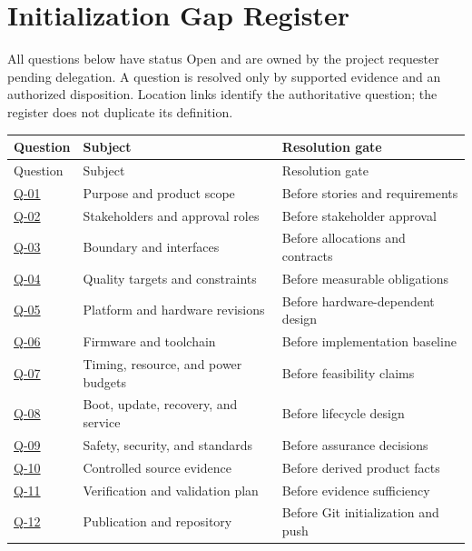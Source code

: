 \section{Initialization Gap Register}
\label{Section:InitializationGaps}
All questions below have status Open and are owned by the project requester
pending delegation. A question is resolved only by supported evidence and an
authorized disposition. Location links identify the authoritative question;
the register does not duplicate its definition.
\begin{tabularx}{\linewidth}{L{1.8cm}YL{4.3cm}}
\caption{Owned Initialization Questions\label{Table:InitializationQuestions}}\\
\toprule Question & Subject & Resolution gate\\\midrule
\endfirsthead
\toprule Question & Subject & Resolution gate\\\midrule
\endhead
\hyperref[Question:Q-01]{Q-01} & Purpose and product scope & Before stories and requirements\\
\hyperref[Question:Q-02]{Q-02} & Stakeholders and approval roles & Before stakeholder approval\\
\hyperref[Question:Q-03]{Q-03} & Boundary and interfaces & Before allocations and contracts\\
\hyperref[Question:Q-04]{Q-04} & Quality targets and constraints & Before measurable obligations\\
\hyperref[Question:Q-05]{Q-05} & Platform and hardware revisions & Before hardware-dependent design\\
\hyperref[Question:Q-06]{Q-06} & Firmware and toolchain & Before implementation baseline\\
\hyperref[Question:Q-07]{Q-07} & Timing, resource, and power budgets & Before feasibility claims\\
\hyperref[Question:Q-08]{Q-08} & Boot, update, recovery, and service & Before lifecycle design\\
\hyperref[Question:Q-09]{Q-09} & Safety, security, and standards & Before assurance decisions\\
\hyperref[Question:Q-10]{Q-10} & Controlled source evidence & Before derived product facts\\
\hyperref[Question:Q-11]{Q-11} & Verification and validation plan & Before evidence sufficiency\\
\hyperref[Question:Q-12]{Q-12} & Publication and repository & Before Git initialization and push\\
\bottomrule\end{tabularx}


